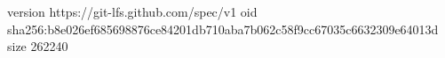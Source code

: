 version https://git-lfs.github.com/spec/v1
oid sha256:b8e026ef685698876ce84201db710aba7b062c58f9cc67035c6632309e64013d
size 262240
